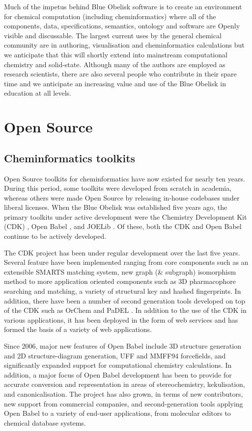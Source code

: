\documentclass[10pt]{bmc_article}
\newenvironment{bmcformat}{\fussy\setboolean{publ}{true}}{\fussy}
\begin{document}
\begin{bmcformat}
Much of the impetus behind Blue Obelisk software is to create an
environment for chemical computation (including cheminformatics) where
all of the components, data, specifications, semantics, ontology and
software are Openly visible and discussable. The largest current uses
by the general chemical community are in authoring, visualisation and
cheminformatics calculations but we anticipate that this will shortly
extend into mainstream computational chemistry and solid-state.
Although many of the authors are employed as research scientists,
there are also several people who contribute in their spare time and
we anticipate an increasing value and use of the Blue Obelisk in
education at all levels.


\section*{Open Source}

\subsection*{Cheminformatics toolkits}

Open Source toolkits for cheminformatics have now existed for nearly
ten years. During this period, some toolkits were developed from
scratch in academia, whereas others were made Open Source by releasing in-house
codebases under liberal licenses. When the Blue Obelisk was
established five years ago, the primary toolkits under active development
were the Chemistry Development Kit (CDK)
\cite{Steinbeck2003, Steinbeck2006}, Open Babel \cite{WebOpenBabel},
and JOELib \cite{WebJOELib}. Of these, both the CDK and Open Babel
continue to be actively developed.

The CDK project has been under regular development over the last five
years. Several feature have been implemented ranging from core
components such as an extensible SMARTS matching system, new graph (\&
subgraph) isomorphism method \cite{smsd} to more application oriented
components such as 3D pharmacophore searching and matching, a variety
of structural key and hashed fingerprints. In addition, there have
been a number of second generation tools developed on top of the CDK
such as OrChem \cite{orchem} and PaDEL \cite{padel}. In addition to
the use of the CDK in various applications, it has been deployed in
the form of web services \cite{Dong:2007aa} and has formed the basis
of a variety of web applications.

Since 2006, major new features of Open Babel include 3D structure
generation and 2D structure-diagram generation, UFF and MMFF94
forcefields, and significantly expanded support for computational
chemistry calculations. In addition, a major focus of Open Babel development
has been to provide for accurate conversion and representation in
areas of stereochemistry, kekulisation, and canonicalisation. The
project has also grown, in terms of new contributors, new support from
commercial companies, and second-generation tools applying Open Babel
to a variety of end-user applications, from molecular editors to
chemical database systems.


\end{bmcformat}
\end{document}
